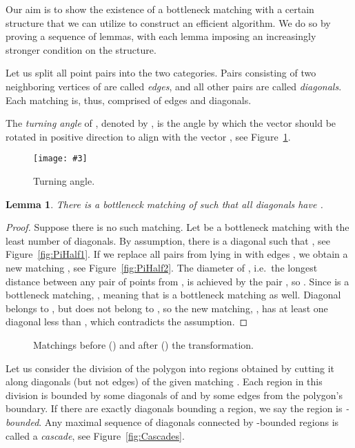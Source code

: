 \documentclass[a4paper, 11pt]{article}
\newtheorem{lemma}[theorem]{Lemma}
\newcommand{\fig}[3]{
	\begin{figure}[ht]
		\centering
		\texttt{[image: \#3]}
		\caption{#2}
		\label{#1}
	\end{figure}
}
\begin{document}
Our aim is to show the existence of a bottleneck matching with a certain structure that we can utilize to construct an efficient algorithm. We do so by proving a sequence of lemmas, with each lemma imposing an increasingly stronger condition on the structure.

Let us split all point pairs into the two categories. Pairs consisting of two neighboring vertices of  are called \emph{edges}, and all other pairs are called \emph{diagonals}. Each matching is, thus, comprised of edges and diagonals.

The \emph{turning angle} of , denoted by , is the angle by which the vector  should be rotated in positive direction to align with the vector , see Figure~\ref{fig:TurningAngle}.

\fig{fig:TurningAngle}{Turning angle.}{TurningAngle.pdf}


\begin{lemma}
	\label{lem:PiHalf}
	There is a bottleneck matching  of  such that all diagonals  have .
\end{lemma}
\begin{proof}
	Suppose there is no such matching. Let  be a bottleneck matching with the least number of diagonals. By assumption, there is a diagonal  such that , see Figure~\ref{fig:PiHalf1}. If we replace all pairs from  lying in  with edges , we obtain a new matching , see Figure~\ref{fig:PiHalf2}. The diameter of , i.e.\ the longest distance between any pair of points from , is achieved by the pair , so . Since  is a bottleneck matching, , meaning that  is a bottleneck matching as well. Diagonal  belongs to , but does not belong to , so the new matching, , has at least one diagonal less than , which contradicts the assumption.
\end{proof}

	\begin{figure}[ht]
		\centering
		\hspace{20pt}
		\caption{Matchings before () and after () the transformation.}
		\label{fig:PiHalf}				
	\end{figure}

Let us consider the division of the polygon  into regions obtained by cutting it along diagonals (but not edges) of the given matching . Each region in this division is bounded by some diagonals of  and by some edges from the polygon's boundary. If there are exactly  diagonals bounding a region, we say the region is \emph{-bounded}. Any maximal sequence of diagonals connected by -bounded regions is called a \emph{cascade}, see Figure~\ref{fig:Cascades}.
\end{document}
